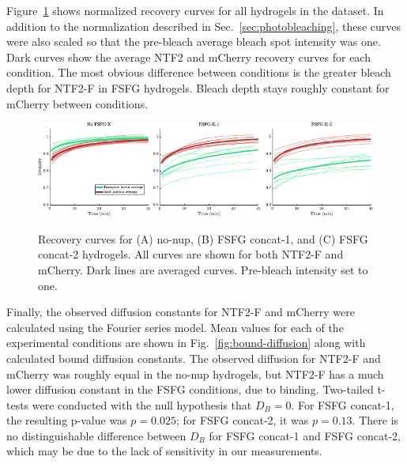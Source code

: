 Figure~\ref{fig:curves} shows normalized recovery curves for all hydrogels in the dataset.  In addition to the normalization described in Sec.~\ref{sec:photobleaching}, these curves were also scaled so that the pre-bleach average bleach spot intensity was one.  Dark curves show the average NTF2 and mCherry recovery curves for each condition.  The most obvious difference between conditions is the greater bleach depth for NTF2-F in FSFG hydrogels.  Bleach depth stays roughly constant for mCherry between conditions.

\begin{figure}
\caption[Recovery curves.]{Recovery curves for (A) no-nup, (B) FSFG concat-1, and (C) FSFG concat-2 hydrogels.  All curves are shown for both NTF2-F and mCherry.  Dark lines are averaged curves.  Pre-bleach intensity set to one. \\}
\centering
\includegraphics[width=\textwidth]{figs/ch04/curves}
\label{fig:curves}
\end{figure} 

Finally, the observed diffusion constants for NTF2-F and mCherry were calculated using the Fourier series model.  Mean values for each of the experimental conditions are shown in Fig.~\ref{fig:bound-diffusion} along with calculated bound diffusion constants.  The observed diffusion for NTF2-F and mCherry was roughly equal in the no-nup hydrogels, but NTF2-F has a much lower diffusion constant in the FSFG conditions, due to binding.  Two-tailed t-tests were conducted with the null hypothesis that $D_B = 0$.  For FSFG concat-1, the resulting p-value was $p = 0.025$; for FSFG concat-2, it was $p = 0.13$.  There is no distinguishable difference between $D_B$ for FSFG concat-1 and FSFG concat-2, which may be due to the lack of sensitivity in our measurements.

